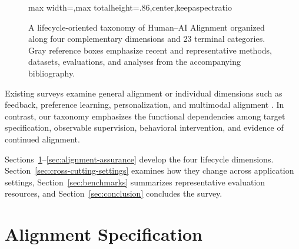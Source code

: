 \documentclass[11pt]{article}
\begin{document}
\begin{figure}[p]
\begin{adjustbox}{max width=\textwidth,max totalheight=.86\textheight,center,keepaspectratio}
\end{adjustbox}
\endgroup
\caption{A lifecycle-oriented taxonomy of Human--AI Alignment organized along four complementary dimensions and 23 terminal categories. Gray reference boxes emphasize recent and representative methods, datasets, evaluations, and analyses from the accompanying bibliography.}
\label{fig:human-ai-alignment-taxonomy}
\end{figure}


Existing surveys examine general alignment or individual dimensions such as feedback, preference learning, personalization, and multimodal alignment \citep{ji2025alignment,fernandes2024feedback,jiang2024preferencesurvey,gao2024unifiedpreference,guan2025personalizedsurvey,yu2025multimodalsurvey}. In contrast, our taxonomy emphasizes the functional dependencies among target specification, observable supervision, behavioral intervention, and evidence of continued alignment.

Sections~\ref{sec:alignment-specification}--\ref{sec:alignment-assurance} develop the four lifecycle dimensions. Section~\ref{sec:cross-cutting-settings} examines how they change across application settings, Section~\ref{sec:benchmarks} summarizes representative evaluation resources, and Section~\ref{sec:conclusion} concludes the survey.






\section{Alignment Specification}
\label{sec:alignment-specification}
\end{document}
